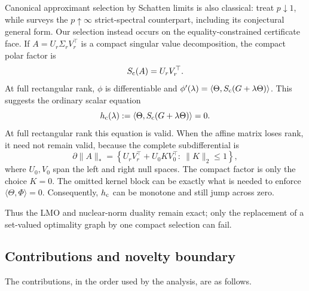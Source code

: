 Canonical approximant selection by Schatten limits is also classical:
\citet{legg1985canonical} treat \(p\downarrow1\), while
\citet{zietak2017strict} surveys the \(p\uparrow\infty\) strict-spectral
counterpart, including its conjectural general form.  Our selection instead
occurs on the equality-constrained certificate face.
If \(A=U_r\Sigma_rV_r^\top\) is a compact singular value decomposition,
the compact polar factor is
\begin{equation}
 S_{\mathrm c}(A)=U_rV_r^\top.
 \label{eq:compact-polar}
\end{equation}
At full rectangular rank, \(\phi\) is differentiable and
\(\phi'(\lambda)=\langle\Theta,S_{\mathrm c}(G+\lambda\Theta)\rangle\).  This suggests
the ordinary scalar equation
\begin{equation}
 h_{\rm c}(\lambda):=
 \langle\Theta,S_{\mathrm c}(G+\lambda\Theta)\rangle=0.
 \label{eq:compact-root}
\end{equation}
At full rectangular rank this equation is valid.  When the affine matrix loses
rank, it need not remain valid, because the complete subdifferential is
\begin{equation}
 \partial\|A\|_*
 =\left\{
 U_rV_r^\top+U_0KV_0^\top:\ \|K\|_2\le1
 \right\},
 \label{eq:full-subdiff}
\end{equation}
where \(U_0,V_0\) span the left and right null spaces.  The compact factor is
only the choice \(K=0\).  The omitted kernel block can be exactly what is
needed to enforce \(\langle\Theta,\Phi\rangle=0\).  Consequently,
\(h_{\rm c}\) can be monotone and still jump across zero.

Thus the LMO and nuclear-norm duality remain exact; only the replacement of a
set-valued optimality graph by one compact selection can fail.

\subsection{Contributions and novelty boundary}

The contributions, in the order used by the analysis, are as follows.

